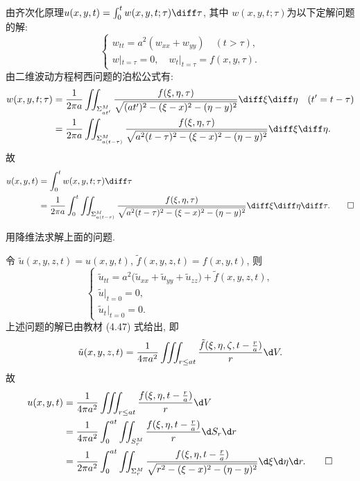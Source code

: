 \begin{solve}
  由齐次化原理$u(x,y,t)=\int_0^tw(x,y,t;\tau)\diff\tau$, 其中 $w(x,y,t;\tau)$为以下定解问题的解:
  \[\begin{cases}
    w_{tt} = a^2(w_{xx}+w_{yy})\quad (t>\tau), \\
    w|_{t=\tau} = 0,\quad w_t|_{t=\tau} = f(x,y,\tau).
  \end{cases}\]
  由二维波动方程柯西问题的泊松公式有:
  \[\begin{split}
    w(x,y,t;\tau)
    & = \frac{1}{2\pi a}\iint_{\Sigma_{at'}^M}
      \frac{f(\xi,\eta,\tau)}{\sqrt{(at')^2
      -(\xi-x)^2-(\eta-y)^2}}\diff\xi\diff\eta\quad(t'=t-\tau)\\
    & = \frac{1}{2\pi a}\iint_{\Sigma_{a(t-\tau)}^M}
      \frac{f(\xi,\eta,\tau)}{\sqrt{a^2(t-\tau)^2-(\xi-x)^2-(\eta-y)^2}}
      \diff\xi\diff\eta.
  \end{split}\]
  故
  \begin{align*}
    u(x,y,t)
    & = \int_0^tw(x,y,t;\tau)\diff\tau \\
    & = \frac{1}{2\pi a}\int_0^t\iint_{\Sigma_{a(t-\tau)}^M}
      \frac{f(\xi,\eta,\tau)}{\sqrt{a^2(t-\tau)^2-(\xi-x)^2-(\eta-y)^2}}
      \diff\xi\diff\eta\diff\tau.\qedhere
  \end{align*}
\end{solve}


\begin{exercise}
  用降维法求解上面的问题.
\end{exercise}

\begin{solve}
  令 $\tilde{u}(x,y,z,t) = u(x,y,t)$, $\tilde{f}(x,y,z,t)=f(x,y,t)$, 则
  \[\begin{cases}
    \tilde{u}_{tt} = a^2\bigl(\tilde{u}_{xx}+\tilde{u}_{yy}+\tilde{u}_{zz}\bigr)
      + \tilde{f}(x,y,z,t), \\
    \tilde{u}|_{t=0} = 0, \\
    \tilde{u}_t|_{t=0} = 0.
  \end{cases}\]
  上述问题的解已由教材 (4.47) 式给出, 即
  \[\tilde{u}(x,y,z,t)
    = \frac{1}{4\pi a^2}\iiint_{r\leq at} 
      \frac{\tilde{f}(\xi,\eta,\zeta,t-\frac{r}{a})}{r}\d V.\]
  故
  \begin{align*}
    u(x,y,t)
    & = \frac{1}{4\pi a^2}\iiint_{r\leq at} \frac{f(\xi,\eta,t-\frac{r}{a})}{r}\d V \\
    & = \frac{1}{4\pi a^2}\int_0^{at} 
      \iint_{S_r^M} \frac{f(\xi, \eta, t-\frac{r}{a})}{r}\d S_r \d r \\
    & = \frac{1}{2\pi a^2} \int_0^{at} \iint_{\Sigma_r^M} \frac{f(\xi,\eta,t-\frac{r}{a})}
      {\sqrt{r^2-(\xi-x)^2-(\eta-y)^2}}\d\xi\d\eta\d r.\qedhere
  \end{align*}
\end{solve}


